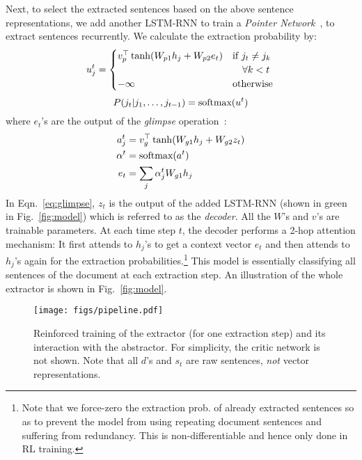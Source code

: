 \documentclass[11pt,a4paper]{article}
\def\figref#1{Fig.~\ref{#1}}
\def\eqnref#1{Eqn.~\ref{#1}}
\begin{document}
Next, to select the extracted sentences based on the above sentence representations, 
we add another LSTM-RNN to train a \textit{Pointer Network}~\citep{NIPS2015_5866:pointer_networks},
to extract sentences recurrently.
We calculate the extraction probability by:
\vspace{-5pt}
\begin{equation} 
\label{eq:ptrnet}
u^t_j = \begin{cases}
  v_p^\top \tanh(
  W_{p1}h_j + W_{p2}e_t) & 
        \text{if } j_t \ne j_k \\
        & \quad \forall k < t\\
  -\infty & \text{otherwise}
\end{cases} \\
\vspace{-5pt}
\end{equation}
\vspace{-5pt}
\begin{equation}
\label{eq:extraction_prob}
P(j_t | j_1, \dots, j_{t-1}) = \text{softmax}(u^t)
\vspace{-5pt}
\end{equation}
where $e_t$'s are the output of the \textit{glimpse} operation~\cite{OrderMatters}:
\vspace{-3pt}
\begin{align} \label{eq:glimpse}
  a^t_j &=
    v_g^\top \tanh(W_{g1}h_j + W_{g2}z_t) \\
  \alpha ^t &= \text{softmax}(a^t) \\
  e_t &= \sum_j \alpha^t_j W_{g1} h_j
  \vspace{-5pt}
\end{align}
In \eqnref{eq:glimpse}, $z_t$ is the output of the added LSTM-RNN (shown in green in \figref{fig:model}) which is 
referred to as the \textit{decoder}.
All the $W$'s and $v$'s are trainable parameters.
At each time step $t$, the decoder performs a 2-hop attention mechanism:
It first attends to $h_j$'s to get a context vector $e_t$ and then attends to $h_j$'s again for the extraction probabilities.\footnote{Note that we force-zero the extraction prob. of already extracted sentences so as to prevent the model from using repeating document sentences and suffering from redundancy. This is non-differentiable and hence only done in RL training.}
This model is essentially classifying all sentences of the document at each extraction step.
An illustration of the whole extractor is shown in \figref{fig:model}.

\begin{figure}
 \centering
 \texttt{[image: figs/pipeline.pdf]}
 \vspace{-0.9cm}
 \caption{
 Reinforced training of the extractor (for one extraction step) and its interaction with the abstractor.
 For simplicity, the critic network is not shown.
 Note that all $d$'s and $s_t$ are raw sentences, \emph{not} vector representations.
 }
 \vspace{-0.2cm}
 \label{fig:pipeline}
\end{figure}
\end{document}
